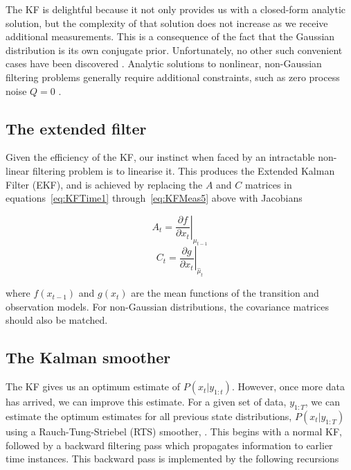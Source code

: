 The KF is delightful because it not only provides us with a closed-form analytic solution, but the complexity of that solution does not increase as we receive additional measurements. This is a consequence of the fact that the Gaussian distribution is its own conjugate prior. Unfortunately, no other such convenient cases have been discovered \cite{Daum2005}. Analytic solutions to nonlinear, non-Gaussian filtering problems generally require additional constraints, such as zero process noise $Q=0$ \cite{Daum2005}.

\subsection{The extended filter}

Given the efficiency of the KF, our instinct when faced by an intractable non-linear filtering problem is to linearise it. This produces the Extended Kalman Filter (EKF), and is achieved by replacing the $A$ and $C$ matrices in equations~\ref{eq:KFTime1} through~\ref{eq:KFMeas5} above with Jacobians

\begin{equation}
A_t = \left . \frac{\partial f}{\partial x_t} \right \vert _{\mu_{t-1}}
\label{eq:EKF1}
\end{equation}
\begin{equation}
C_t = \left . \frac{\partial g}{\partial x_t} \right \vert _{\hat{\mu}_t}
\label{eq:EKF2}
\end{equation}

where $f(x_{t-1})$ and $g(x_t)$ are the mean functions of the transition and observation models. For non-Gaussian distributions, the covariance matrices should also be matched.



\subsection{The Kalman smoother}

The KF gives us an optimum estimate of $P(x_t|y_{1:t})$. However, once more data has arrived, we can improve this estimate. For a given set of data, $y_{1:T}$, we can estimate the optimum estimates for all previous state distributions, $P(x_{t}| y_{1:T})$ using a Rauch-Tung-Striebel (RTS) smoother, \cite{Rauch1965}. This begins with a normal KF, followed by a backward filtering pass which propagates information to earlier time instances. This backward pass is implemented by the following recursions

